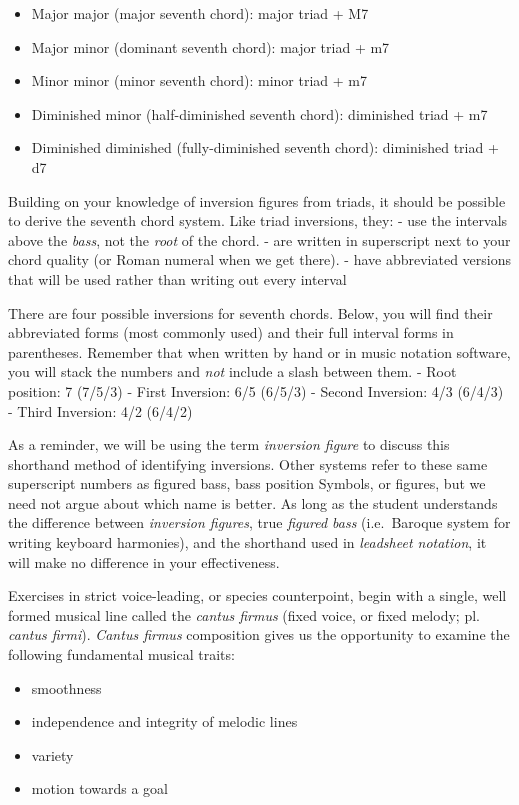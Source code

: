 \documentclass{book}
\providecommand{\tightlist}{%
  \setlength{\itemsep}{0pt}\setlength{\parskip}{0pt}}
\begin{document}
\begin{itemize}
\tightlist
\item
  Major major (major seventh chord): major triad + M7
\item
  Major minor (dominant seventh chord): major triad + m7
\item
  Minor minor (minor seventh chord): minor triad + m7
\item
  Diminished minor (half-diminished seventh chord): diminished triad + m7
\item
  Diminished diminished (fully-diminished seventh chord): diminished triad +
  d7
\end{itemize}

Building on your knowledge of inversion figures from triads, it should be
possible to derive the seventh chord system. Like triad inversions, they: -
use the intervals above the \emph{bass}, not the \emph{root} of the chord. -
are written in superscript next to your chord quality (or Roman numeral when
we get there). - have abbreviated versions that will be used rather than
writing out every interval

There are four possible inversions for seventh chords. Below, you will find
their abbreviated forms (most commonly used) and their full interval forms in
parentheses. Remember that when written by hand or in music notation software,
you will stack the numbers and \emph{not} include a slash between them. - Root
position: 7 (7/5/3) - First Inversion: 6/5 (6/5/3) - Second Inversion: 4/3
(6/4/3) - Third Inversion: 4/2 (6/4/2)

As a reminder, we will be using the term \emph{inversion figure} to discuss
this shorthand method of identifying inversions. Other systems refer to these
same superscript numbers as figured bass, bass position Symbols, or figures,
but we need not argue about which name is better. As long as the student
understands the difference between \emph{inversion figures}, true
\emph{figured bass} (i.e.~Baroque system for writing keyboard harmonies), and
the shorthand used in \emph{leadsheet notation}, it will make no difference in
your effectiveness.

Exercises in strict voice-leading, or species counterpoint, begin with a
single, well formed musical line called the \emph{cantus firmus} (fixed voice,
or fixed melody; pl. \emph{cantus firmi}). \emph{Cantus firmus} composition
gives us the opportunity to examine the following fundamental musical traits:

\begin{itemize}
\tightlist
\item
  smoothness\\
\item
  independence and integrity of melodic lines\\
\item
  variety\\
\item
  motion towards a goal
\end{itemize}
\end{document}
